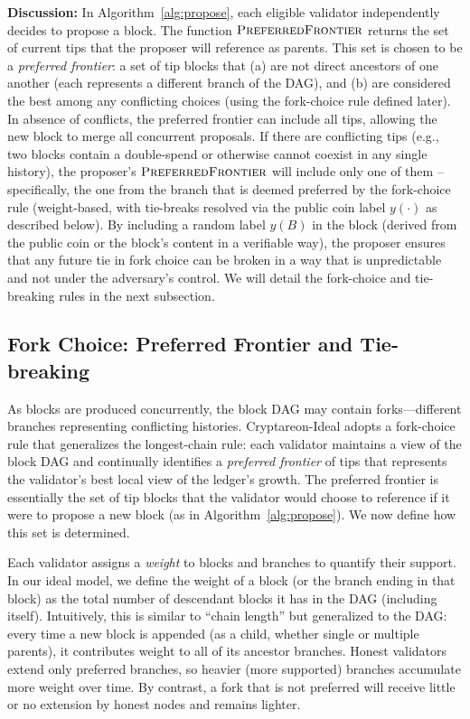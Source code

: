 \noindent \textbf{Discussion:} In Algorithm~\ref{alg:propose}, each eligible validator independently decides to propose a block. The function $\Call{PreferredFrontier}{}$ returns the set of current tips that the proposer will reference as parents. This set is chosen to be a \emph{preferred frontier}: a set of tip blocks that (a) are not direct ancestors of one another (each represents a different branch of the DAG), and (b) are considered the best among any conflicting choices (using the fork-choice rule defined later). In absence of conflicts, the preferred frontier can include all tips, allowing the new block to merge all concurrent proposals. If there are conflicting tips (e.g., two blocks contain a double-spend or otherwise cannot coexist in any single history), the proposer’s $\Call{PreferredFrontier}{}$ will include only one of them – specifically, the one from the branch that is deemed preferred by the fork-choice rule (weight-based, with tie-breaks resolved via the public coin label $y(\cdot)$ as described below). By including a random label $y(B)$ in the block (derived from the public coin or the block’s content in a verifiable way), the proposer ensures that any future tie in fork choice can be broken in a way that is unpredictable and not under the adversary’s control. We will detail the fork-choice and tie-breaking rules in the next subsection.

\subsection{Fork Choice: Preferred Frontier and Tie-breaking}\label{sec:fork-choice}

As blocks are produced concurrently, the block DAG may contain forks—different branches representing conflicting histories. Cryptareon-Ideal adopts a fork-choice rule that generalizes the longest-chain rule: each validator maintains a view of the block DAG and continually identifies a \emph{preferred frontier} of tips that represents the validator’s best local view of the ledger’s growth. The preferred frontier is essentially the set of tip blocks that the validator would choose to reference if it were to propose a new block (as in Algorithm~\ref{alg:propose}). We now define how this set is determined.

Each validator assigns a \emph{weight} to blocks and branches to quantify their support. In our ideal model, we define the weight of a block (or the branch ending in that block) as the total number of descendant blocks it has in the DAG (including itself). Intuitively, this is similar to ``chain length'' but generalized to the DAG: every time a new block is appended (as a child, whether single or multiple parents), it contributes weight to all of its ancestor branches. Honest validators extend only preferred branches, so heavier (more supported) branches accumulate more weight over time. By contrast, a fork that is not preferred will receive little or no extension by honest nodes and remains lighter.

